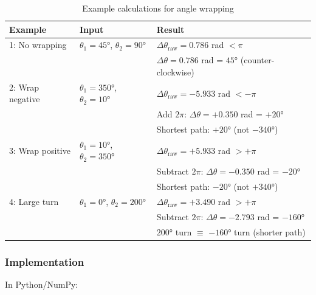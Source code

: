 \documentclass[
  11pt,
]{article}
\begin{document}
\begin{table}[H]
\centering
\footnotesize
\begin{tabular}{p{2.5cm}p{5cm}p{6.5cm}}
\hline
\textbf{Example} & \textbf{Input} & \textbf{Result} \\
\hline
1: No wrapping & $\theta_1 = 45°$, $\theta_2 = 90°$ & $\Delta\theta_{\text{raw}} = 0.786$ rad $< \pi$ \\
 & & $\Delta\theta = 0.786$ rad = $45°$ (counter-clockwise) \\
\hline
2: Wrap negative & $\theta_1 = 350°$, $\theta_2 = 10°$ & $\Delta\theta_{\text{raw}} = -5.933$ rad $< -\pi$ \\
 & & Add $2\pi$: $\Delta\theta = +0.350$ rad = $+20°$ \\
 & & Shortest path: $+20°$ (not $-340°$) \\
\hline
3: Wrap positive & $\theta_1 = 10°$, $\theta_2 = 350°$ & $\Delta\theta_{\text{raw}} = +5.933$ rad $> +\pi$ \\
 & & Subtract $2\pi$: $\Delta\theta = -0.350$ rad = $-20°$ \\
 & & Shortest path: $-20°$ (not $+340°$) \\
\hline
4: Large turn & $\theta_1 = 0°$, $\theta_2 = 200°$ & $\Delta\theta_{\text{raw}} = +3.490$ rad $> +\pi$ \\
 & & Subtract $2\pi$: $\Delta\theta = -2.793$ rad = $-160°$ \\
 & & $200°$ turn $\equiv$ $-160°$ turn (shorter path) \\
\hline
\end{tabular}
\caption{Example calculations for angle wrapping}

\end{table}

\hypertarget{implementation}{%
\subsubsection{Implementation}\label{implementation}}

In Python/NumPy:
\end{document}
